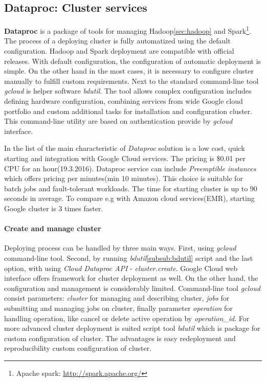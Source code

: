 \documentclass[a4paper,12pt,oneside]{report}
\begin{document}
	
	
	\subsection{Dataproc: Cluster services}
	\label{subsub:dataproc}
	\textbf{Dataproc} is a package of tools for managing Hadoop\ref{sec:hadoop} 
	and Spark\footnote{Apache spark: \url{http://spark.apache.org/}}.
	The process of a deploying cluster is fully automatized using the default 
	configuration. Hadoop and Spark deployment are compatible with official
	releases. With default configuration, the configuration of automatic deployment is simple. 
	On the other hand in the most cases, it is 
	necessary to configure cluster manually to fulfill custom requirements. 
	Next to the standard command-line tool \textit{gcloud} is 
	helper software \emph{bdutil}.  The tool  allows complex 
	configuration includes 
	defining hardware configuration, combining services from wide Google cloud 
	portfolio and custom additional tasks for installation and configuration
	cluster. 
	This command-line utility are based on authentication provide by \textit{gcloud}
	interface.
	
	In the list of the main characteristic of \textit{Dataproc} solution is a 
	low cost, quick starting and integration with Google Cloud services. 
	The pricing is  \$0.01 per CPU for an hour(19.3.2016). Dataproc service can 
	include \textit{Preemptible instances} which offers pricing 
	per minutes(min 10 minutes). This choice is suitable for batch jobs and 
	fault-tolerant workloads. The time for starting cluster is up to 
	90 seconds in average. To compare e.g with Amazon cloud
	services(EMR)\cite{amazon_emr}, starting Google cluster is 3 times faster.
	
	\paragraph{Create and manage cluster} Deploying process can be handled by three
	main ways. First, using \textit{gcloud} command-line tool. Second, by running
	\textit{bdutil}\ref{subsub:bdutil} script and the last option, with using 
	\textit{Cloud Dataproc API} - \textit{cluster.create}. Google Cloud web
	interface offers framework for cluster deployment as well. On the other hand,
	the configuration and management is considerably limited. Command-line tool
	\textit{gcloud} consist parameters: \textit{cluster} for managing and describing
	cluster, \textit{jobs} for submitting 	and managing jobs on cluster, finally parameter
	\textit{operation} for handling operation, like cancel or delete active 
	operation by \emph{operation\_id}. For more advanced cluster deployment is	
	suited script tool \textit{bdutil} which is 
	package for custom configuration of cluster. The advantages is easy
	redeployment and	reproducibility custom	configuration of cluster. 
	
\end{document}
